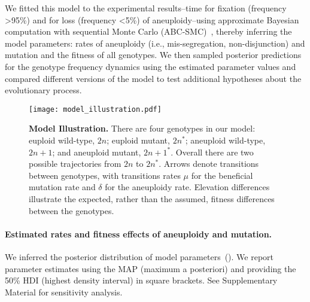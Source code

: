 \documentclass[12pt]{article}
\newcommand{\euwt}{\emph{$2n$}}
\newcommand{\anwt}{\emph{$2n+1$}}
\newcommand{\eumt}{\emph{$2n^*$}}
\newcommand{\anmt}{\emph{$2n+1^*$}}
\begin{document}
We fitted this model to the experimental results\citep{Yona2012}--time for fixation (frequency >95\%) and for loss (frequency <5\%) of aneuploidy--using approximate Bayesian computation with sequential Monte Carlo (ABC-SMC)~\citep{Sisson2009}, thereby inferring the model parameters: rates of aneuploidy (i.e., mis-segregation, non-disjunction) and mutation and the fitness of all genotypes.
We then sampled posterior predictions for the genotype frequency dynamics using the estimated parameter values and compared different versions of the model to test additional hypotheses about the evolutionary process.


\begin{figure}[h]
  \centering
    \texttt{[image: model\_illustration.pdf]}      
  \caption{
    \textbf{Model Illustration.}
    There are four genotypes in our model: euploid wild-type, \euwt; euploid mutant, \eumt; aneuploid wild-type, \anwt; and aneuploid mutant, \anmt.
    Overall there are two possible trajectories from \euwt\; to \eumt.
    Arrows denote transitions between genotypes, with transitions rates $\mu$ for the beneficial mutation rate and $\delta$ for the aneuploidy rate.
    Elevation differences illustrate the expected, rather than the assumed, fitness differences between the genotypes.
   }
  \label{fig:models}
\end{figure}


\paragraph{Estimated rates and fitness effects of aneuploidy and mutation.} 
We inferred the posterior distribution of model parameters~(). 
We report parameter estimates using the MAP (maximum a posteriori) and providing the 50\% HDI (highest density interval) in square brackets. See Supplementary Material for sensitivity analysis.
\end{document}

